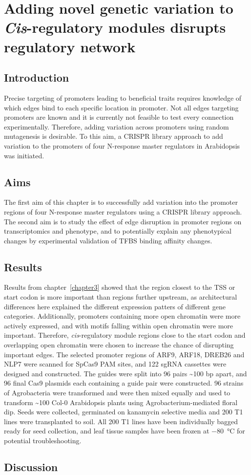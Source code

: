\documentclass[../main.tex]{subfiles}
\begin{document}
\chapter{Adding novel genetic variation to \textit{Cis}\hyp{}regulatory modules disrupts regulatory network}\label{chapter7}
\section{Introduction}\label{chapter7:introduction}

Precise targeting of promoters leading to beneficial traits requires knowledge of which edges bind to each specific location in promoter.
Not all edges targeting promoters are known and it is currently not feasible to test every connection experimentally.
Therefore, adding variation across promoters using random mutagenesis is desirable.
To this aim, a CRISPR library approach to add variation to the promoters of four N-response master regulators in Arabidopsis was initiated.
\section{Aims}\label{chapter7:aims}
The first aim of this chapter is to successfully add variation into the promoter regions of four N\hyp{}response master regulators using a CRISPR library approach.
The second aim is to study the effect of edge disruption in promoter regions on transcriptomics and phenotype, and to potentially explain any phenotypical changes by experimental validation of TFBS binding affinity changes.

\section{Results}\label{chapter7:results}
Results from chapter~\ref{chapter3} showed that the region closest to the TSS or start codon is more important than regions further upstream, as architectural differences here explained the different expression patters of different gene categories.
Additionally, promoters containing more open chromatin were more actively expressed, and with motifs falling within open chromatin were more important.
Therefore, \textit{cis}\hyp{}regulatory module regions close to the start codon and overlapping open chromatin were chosen to increase the chance of disrupting important edges.
The selected promoter regions of ARF9, ARF18, DREB26 and NLP7 were scanned for SpCas9 PAM sites, and 122 sgRNA cassettes were designed and constructed.
The guides were split into 96 pairs \textasciitilde{}100 bp apart, and 96 final Cas9 plasmids each containing a guide pair were constructed.
96 strains of Agrobacteria were transformed and were then mixed equally and used to transform \textasciitilde{}100 Col-0 Arabidopsis plants using Agrobacterium\hyp{}mediated floral dip.
Seeds were collected, germinated on kanamycin selective media and 200 T1 lines were transplanted to soil.
All 200 T1 lines have been individually bagged ready for seed collection, and leaf tissue samples have been frozen at \SI{-80}{\degreeCelsius} for potential troubleshooting.

\section{Discussion}\label{chapter7:discussion}
\end{document}
